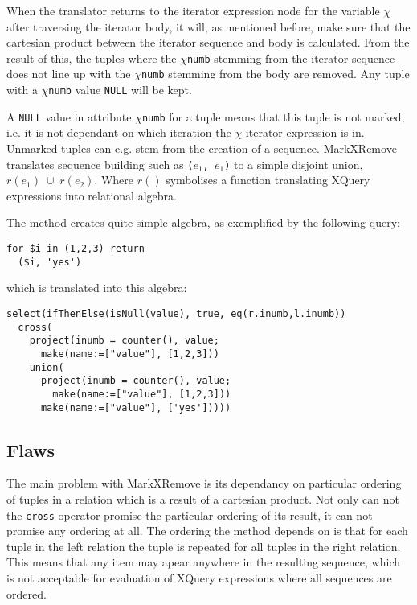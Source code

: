 When the translator returns to the iterator expression node for the variable $\chi$ after traversing the iterator
body, it will, as mentioned before, make sure that the cartesian product between the iterator sequence and body is
calculated. From the result of this, the tuples where the $\chi$\texttt{numb} stemming from the iterator
sequence does not line up with the $\chi$\texttt{numb} stemming from the body are removed. Any tuple with a
$\chi$\texttt{numb} value \texttt{NULL} will be kept.

A \texttt{NULL} value in attribute $\chi$\texttt{numb} for a tuple means that this tuple is not marked, i.e. it is
not dependant on which iteration the $\chi$ iterator expression is in. Unmarked tuples can e.g. stem
from the creation of a sequence. MarkXRemove translates sequence building such as \texttt{(}$e_{1}$\texttt{,
}$e_{1}$\texttt{)} to a simple disjoint union, $r(e_{1})\;\dot\cup\;r(e_{2})$. Where $r()$ symbolises a function
translating XQuery expressions into relational algebra.

The method creates quite simple algebra, as exemplified by the following query:
\begin{Verbatim}
for $i in (1,2,3) return 
  ($i, 'yes')
\end{Verbatim}

which is translated into this algebra:

\begin{Verbatim}
select(ifThenElse(isNull(value), true, eq(r.inumb,l.inumb))
  cross(
    project(inumb = counter(), value;
      make(name:=["value"], [1,2,3]))
    union(
      project(inumb = counter(), value;
        make(name:=["value"], [1,2,3]))
      make(name:=["value"], ['yes']))))
\end{Verbatim} 

\subsection{Flaws}
\label{sect:translation:mxr:flaws}
The main problem with MarkXRemove is its dependancy on particular ordering of tuples in a relation which is a
result of a cartesian product. Not only can not the \texttt{cross} operator promise the particular ordering of its
result, it can not promise any ordering at all. The ordering the method depends on is that for each tuple in the
left relation the tuple is repeated for all tuples in the right relation. This means that any item may apear
anywhere in the resulting sequence, which is not acceptable for evaluation of XQuery expressions where all
sequences are ordered.

